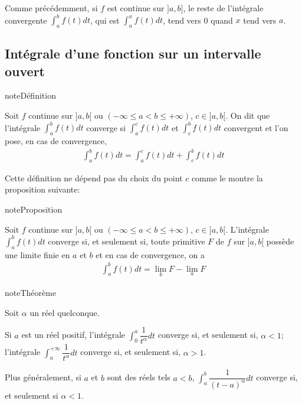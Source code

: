\documentclass[letterpaper,10pt,french]{sphinxmanual}
\begin{document}
\sphinxAtStartPar
{} Comme précédemment, si \(f\) est continue sur \(]a, b]\), le reste de l’intégrale convergente \(\int_a^b f(t)dt\), qui est \(\int_a^x f(t)dt\), tend vers 0 quand \(x\) tend vers \(a\).


\subsection{Intégrale d’une fonction sur un intervalle ouvert}
\label{\detokenize{def:integrale-d-une-fonction-sur-un-intervalle-ouvert}}
\begin{sphinxadmonition}{note}{Définition}

\sphinxAtStartPar
Soit \(f\) continue sur \(]a, b[\) ou \((-\infty \leq a < b \leq +\infty)\), \(c \in ]a, b[\). On dit que l’intégrale \(\int_a^b f(t)dt\) converge si \(\int_a^c f(t)dt\) et \(\int_c^b f(t)dt\) convergent et l’on pose, en cas de convergence,
\begin{equation*}
\begin{split}
\int_a^b f(t)dt = \int_a^c f(t)dt + \int_c^b f(t)dt
\end{split}
\end{equation*}\end{sphinxadmonition}

\sphinxAtStartPar
Cette définition ne dépend pas du choix du point \(c\) comme le montre la proposition suivante:

\begin{sphinxadmonition}{note}{Proposition}

\sphinxAtStartPar
Soit \(f\) continue sur \(]a, b[\) ou \((-\infty \leq a < b \leq +\infty)\), \(c \in ]a, b[\). L’intégrale \(\int_a^b f(t)dt\) converge si, et seulement si, toute primitive \(F\) de \(f\) sur \(]a, b[\) possède une limite finie en \(a\) et \(b\) et en cas de convergence, on a
\begin{equation*}
\begin{split}
\int_a^b f(t)dt = \lim_b F - \lim_a F
\end{split}
\end{equation*}\end{sphinxadmonition}

\begin{sphinxadmonition}{note}{Théorème}

\sphinxAtStartPar
Soit \(\alpha\) un réel quelconque.

\sphinxAtStartPar
Si \(a\) est un réel positif, l’intégrale \(\int_0^a \dfrac{1}{t^\alpha} dt \) converge si, et seulement si, \(\alpha <1\); l’intégrale \(\int_a^{+\infty} \dfrac{1}{t^\alpha} dt \) converge si, et seulement si, \(\alpha > 1\).

\sphinxAtStartPar
Plus généralement, si \(a\) et \(b\) sont des réels tels \(a<b\), \(\int_a^b \dfrac{1}{(t-a)^{\alpha}}dt \) converge si, et seulement si \(\alpha <1\).
\end{sphinxadmonition}
\end{document}
